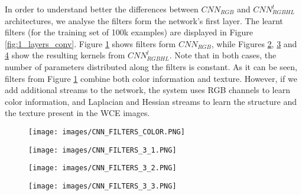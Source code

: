 \documentclass[review,12pt,3p]{elsarticle}
\begin{document}
In order to understand better the differences between $CNN_{RGB}$ and $CNN^l_{RGBHL}$ architectures, we analyse the filters form the network's first layer. The learnt filters (for the training set of 100k examples) are displayed in Figure \ref{fig:1_layers_conv}. Figure \ref{fig:1_layers_conv_RGB} shows filters form $CNN_{RGB}$, while Figures \ref{fig:1_layers_conv_RGBHL1}, \ref{fig:1_layers_conv_RGBHL2} and \ref{fig:1_layers_conv_RGBHL3} show the resulting kernels from $CNN^l_{RGBHL}$. Note that in both cases, the number of parameters distributed along the filters is constant. As it can be seen, filters from Figure \ref{fig:1_layers_conv_RGB} combine both color information and texture. However, if we add additional streams to the network, the system uses RGB channels to learn color information, and Laplacian and Hessian streams to learn the structure and the texture present in the WCE images. 

\begin{figure*}[!ht]
    \centering
    \begin{subfigure}[b]{0.22\textwidth}
        \texttt{[image: images/CNN\_FILTERS\_COLOR.PNG]}
        \caption{}
        \label{fig:1_layers_conv_RGB}
    \end{subfigure}
    \begin{subfigure}[b]{0.22\textwidth}
        \texttt{[image: images/CNN\_FILTERS\_3\_1.PNG]}
        \caption{}
        \label{fig:1_layers_conv_RGBHL1}
    \end{subfigure}
     \begin{subfigure}[b]{0.22\textwidth}
        \texttt{[image: images/CNN\_FILTERS\_3\_2.PNG]}
        \caption{}
        \label{fig:1_layers_conv_RGBHL2}
    \end{subfigure}
     \begin{subfigure}[b]{0.22\textwidth}
        \texttt{[image: images/CNN\_FILTERS\_3\_3.PNG]}
        \caption{}
        \label{fig:1_layers_conv_RGBHL3}
    \end{subfigure}
    \caption{Visualization of the learnt filters: (a) 64 filters from $CNN_{RGB}$, (b) 32 color filters from $CNN^l_{RGBHL}$, (c) 16 Laplacian filters from $CNN^l_{RGBHL}$, (d) 16 Hessian filters from $CNN^l_{RGBHL}$. All filters are $25 \times 25$ pixels. The figure is best seen in color.}
    \label{fig:1_layers_conv}
\end{figure*}
\end{document}
